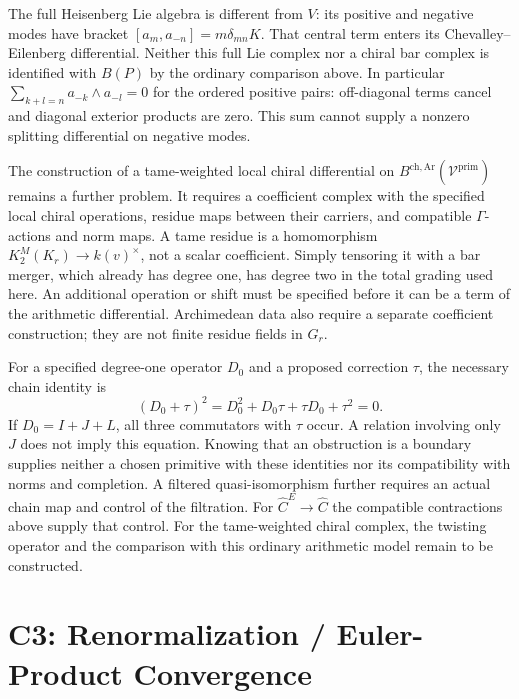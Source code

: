 The full Heisenberg Lie algebra is different from \(V\): its
positive and negative modes have bracket
\([a_m,a_{-n}]=m\delta_{mn}K\). That central term enters its
Chevalley--Eilenberg differential. Neither this full Lie complex
nor a chiral bar complex is identified with \(B(P)\) by the
ordinary comparison above. In particular
\(\sum_{k+l=n}a_{-k}\wedge a_{-l}=0\) for the ordered positive
pairs: off-diagonal terms cancel and diagonal exterior products
are zero. This sum cannot supply a nonzero splitting differential
on negative modes.

\begin{remark}
\label{v4-arith:pos-costello:thm:C2-closed}
The construction of a tame-weighted local chiral differential on
\(B^{\mathrm{ch,Ar}}(\mathcal V^{\mathrm{prim}})\) remains a further
problem. It requires a coefficient complex with the specified
local chiral operations, residue maps between their carriers,
and compatible \(\Gamma\)-actions and norm maps. A tame residue
is a homomorphism \(K_2^M(K_r)\to k(v)^\times\), not a scalar
coefficient. Simply tensoring it with a bar merger, which already
has degree one, has degree two in the total grading used here.
An additional operation or shift must be specified before it can
be a term of the arithmetic differential. Archimedean data also
require a separate coefficient construction; they are not finite
residue fields in \(G_r\).
\end{remark}

\begin{remark}
\label{v4-arith:pos-costello:rem:GM-machinery}
For a specified degree-one operator \(D_0\) and a proposed
correction \(\tau\), the necessary chain identity is
\[
 (D_0+\tau)^2=D_0^2+D_0\tau+\tau D_0+\tau^2=0.
\]
If \(D_0=I+J+L\), all three commutators with \(\tau\) occur.
A relation involving only \(J\) does not imply this equation.
Knowing that an obstruction is a boundary supplies neither a
chosen primitive with these identities nor its compatibility
with norms and completion. A filtered quasi-isomorphism further
requires an actual chain map and control of the filtration.
For \(\widehat C^E\to\widehat C\) the compatible contractions
above supply that control. For the tame-weighted chiral complex,
the twisting operator and the comparison with this ordinary
arithmetic model remain to be constructed.
\end{remark}

\section{C3: Renormalization / Euler-Product Convergence}
\label{v4-arith:pos-costello:C3}

